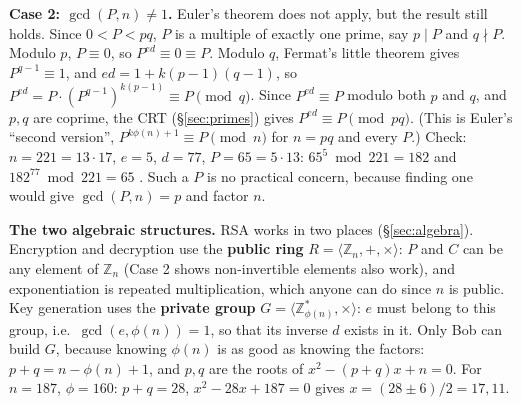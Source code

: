 \textbf{Case 2: $\gcd(P, n) \ne 1$.} Euler's theorem does not apply, but the result still holds. Since $0 < P < pq$, $P$ is a multiple of exactly one prime, say $p \mid P$ and $q \nmid P$. Modulo $p$, $P \equiv 0$, so $P^{ed} \equiv 0 \equiv P$. Modulo $q$, Fermat's little theorem gives $P^{q-1} \equiv 1$, and $ed = 1 + k(p-1)(q-1)$, so $P^{ed} = P \cdot (P^{q-1})^{k(p-1)} \equiv P \pmod q$. Since $P^{ed} \equiv P$ modulo both $p$ and $q$, and $p, q$ are coprime, the CRT (\S\ref{sec:primes}) gives $P^{ed} \equiv P \pmod{pq}$. (This is Euler's ``second version'', $P^{k\phi(n)+1} \equiv P \pmod n$ for $n = pq$ and every $P$.) Check: $n = 221 = 13 \cdot 17$, $e = 5$, $d = 77$, $P = 65 = 5 \cdot 13$: $65^5 \bmod 221 = 182$ and $182^{77} \bmod 221 = 65$ \checkmark. Such a $P$ is no practical concern, because finding one would give $\gcd(P, n) = p$ and factor $n$.

\textbf{The two algebraic structures.} RSA works in two places (\S\ref{sec:algebra}). Encryption and decryption use the \textbf{public ring} $R = \langle \mathbb{Z}_n, +, \times \rangle$: $P$ and $C$ can be any element of $\mathbb{Z}_n$ (Case 2 shows non-invertible elements also work), and exponentiation is repeated multiplication, which anyone can do since $n$ is public. Key generation uses the \textbf{private group} $G = \langle \mathbb{Z}_{\phi(n)}^*, \times \rangle$: $e$ must belong to this group, i.e.\ $\gcd(e, \phi(n)) = 1$, so that its inverse $d$ exists in it. Only Bob can build $G$, because knowing $\phi(n)$ is as good as knowing the factors: $p + q = n - \phi(n) + 1$, and $p, q$ are the roots of $x^2 - (p+q)x + n = 0$. For $n = 187$, $\phi = 160$: $p + q = 28$, $x^2 - 28x + 187 = 0$ gives $x = (28 \pm 6)/2 = 17, 11$.

